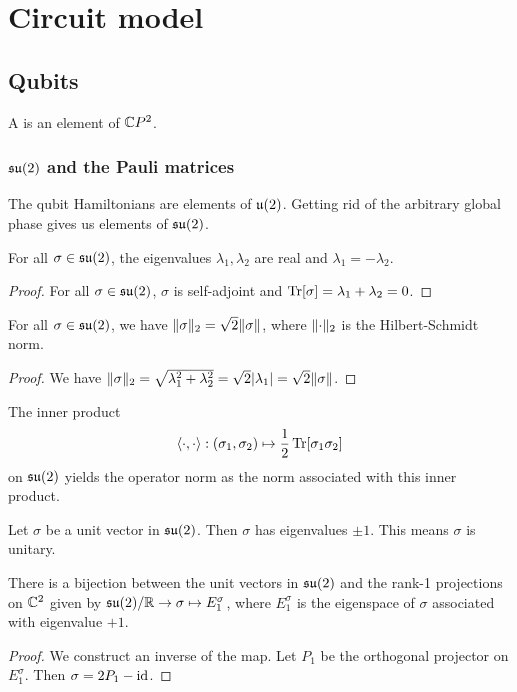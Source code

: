 \chapter{Circuit model}
\section{Qubits}
\begin{definition}
A  is an element of $\mathbb{C} P^2$.
\end{definition}

\subsection{$\operatorname{\mathfrak{su}}(2)$ and the Pauli matrices}
The qubit Hamiltonians are elements of $\operatorname{\mathfrak{u}}(2)$. Getting rid of the arbitrary global phase gives us elements of $\operatorname{\mathfrak{su}}(2)$.

\begin{lemma} \label{su2Eigenvalues}
For all $\sigma\in \operatorname{\mathfrak{su}}(2)$, the eigenvalues $\lambda_1, \lambda_2$ are real and $\lambda_1 = -\lambda_2$.
\end{lemma}
\begin{proof}
For all $\sigma\in \operatorname{\mathfrak{su}}(2)$, $\sigma$ is self-adjoint and $\operatorname{Tr}[\sigma] = \lambda_1 + \lambda_2 = 0$. 
\end{proof}
\begin{corollary}
For all $\sigma\in \operatorname{\mathfrak{su}}(2)$, we have $\lVert\sigma\rVert_{2} = \sqrt{2}\lVert\sigma\rVert$, where $\lVert\cdot\rVert_2$ is the Hilbert-Schmidt norm.
\end{corollary}
\begin{proof}
We have $\lVert\sigma\rVert_{2} = \sqrt{\lambda_1^2 + \lambda_2^2} = \sqrt{2}|\lambda_1| = \sqrt{2}\lVert\sigma\rVert$.
\end{proof}
\begin{corollary}
The inner product
\[ \inner{\cdot,\cdot}: (\sigma_1,\sigma_2) \mapsto \frac{1}{2}\Tr[\sigma_1\sigma_2] \]
on $\operatorname{\mathfrak{su}}(2)$ yields the operator norm as the norm associated with this inner product.
\end{corollary}
\begin{corollary} \label{eigenvaluesUnitVectorsu2}
Let $\sigma$ be a unit vector in $\operatorname{\mathfrak{su}}(2)$. Then $\sigma$ has eigenvalues $\pm 1$. This means $\sigma$ is unitary.
\end{corollary}
\begin{corollary} \label{BlochBijection}
There is a bijection between the unit vectors in $\operatorname{\mathfrak{su}}(2)$ and the rank-1 projections on $\mathbb{C}^2$ given by $\operatorname{\mathfrak{su}}(2)/\mathbb{R} \to \sigma\mapsto E^\sigma_{1}$, where $E^\sigma_{1}$ is the eigenspace of $\sigma$ associated with eigenvalue $+1$.
\end{corollary}
\begin{proof}
We construct an inverse of the map. Let $P_1$ be the orthogonal projector on $E^\sigma_{1}$. Then $\sigma = 2P_1 - \operatorname{id}$.
\end{proof}


